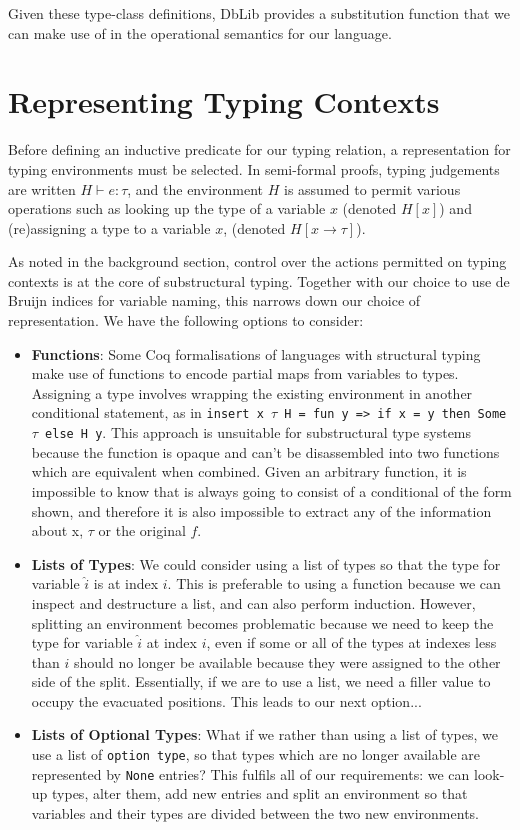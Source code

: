 \documentclass[]{unswthesis}
\let\c\texttt
\begin{document}
Given these type-class definitions, DbLib provides a substitution function that we can make use of in the operational semantics for our language.

\section{Representing Typing Contexts}

Before defining an inductive predicate for our typing relation, a representation for typing environments must be selected. In semi-formal proofs, typing judgements are written $H \vdash e : \tau$, and the environment $H$ is assumed to permit various operations such as looking up the type of a variable $x$ (denoted $H[x]$) and (re)assigning a type to a variable $x$, (denoted $H[x \to \tau]$).

As noted in the background section, control over the actions permitted on typing contexts is at the core of substructural typing. Together with our choice to use de Bruijn indices for variable naming, this narrows down our choice of representation. We have the following options to consider:

\begin{itemize}
\item \textbf{Functions}: Some Coq formalisations of languages with structural typing \cite{pierce15} make use of functions to encode partial maps from variables to types. Assigning a type involves wrapping the existing environment in another conditional statement, as in \c{insert x $\tau$ H = fun y => if x = y then Some $\tau$ else H y}. This approach is unsuitable for substructural type systems because the function is opaque and can't be disassembled into two functions which are equivalent when combined. Given an arbitrary function, it is impossible to know that is always going to consist of a conditional of the form shown, and therefore it is also impossible to extract any of the information about x, $\tau$ or the original $f$.
\item \textbf{Lists of Types}: We could consider using a list of types so that the type for variable $\hat{i}$ is at index $i$. This is preferable to using a function because we can inspect and destructure a list, and can also perform induction. However, splitting an environment becomes problematic because we need to keep the type for variable $\hat{i}$ at index $i$, even if some or all of the types at indexes less than $i$ should no longer be available because they were assigned to the other side of the split. Essentially, if we are to use a list, we need a filler value to occupy the evacuated positions. This leads to our next option...
\item \textbf{Lists of Optional Types}: What if we rather than using a list of types, we use a list of \c{option type}, so that types which are no longer available are represented by \c{None} entries? This fulfils all of our requirements: we can look-up types, alter them, add new entries and split an environment so that variables and their types are divided between the two new environments.
\end{itemize}
\end{document}
